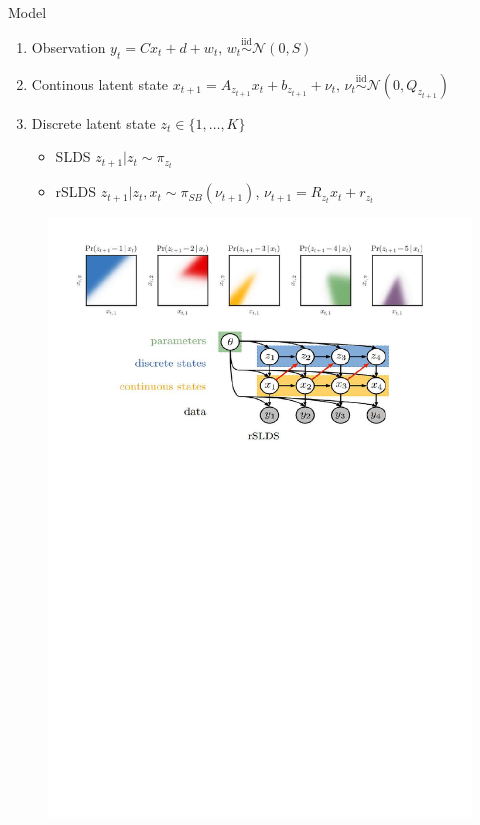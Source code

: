 \documentclass{beamer}
\begin{document}
\begin{frame}{Model}%

\begin{tcolorbox}[colback=blue!10!white,colframe=blue!50!black,title=SLDS and rSLDS,boxrule=2pt, boxsep=0.1em, left=0.1em, right=0.1em,
fontupper=\fontsize{8}{10}\selectfont] %
\begin{enumerate}[\textbullet]
\item Observation $y_t=C x_t+d+w_t\text{, }w_t \overset{\mathrm{iid}}{\sim} \mathcal{N}(0,S)$
\item Continous latent state $x_{t+1}=A_{z_{t+1}}x_t+b_{z_{t+1}}+\nu_t \text{, } \nu_t \overset{\mathrm{iid}}{\sim} \mathcal{N}(0,Q_{z_{t+1}})$
    \item Discrete latent state $z_t \in \{1,\dots,K\}$
        \begin{itemize}
            \item SLDS {\cite{Ackerson&Fu}}
$z_{t+1} | z_t \sim \pi_{z_t}$
            \item rSLDS {\cite{Barber}}
 $z_{t+1} | z_t, x_t \sim \pi_{SB}(\nu_{t+1})$, $\nu_{t+1}=R_{z_t}x_t+r_{z_t}$
        \end{itemize}
\end{enumerate}
\end{tcolorbox}

\begin{figure}
    \centering
    \includegraphics[width=0.8\linewidth]{gallery/model_p1.pdf}
    \caption{}
  \end{figure}




\end{frame}
\end{document}
